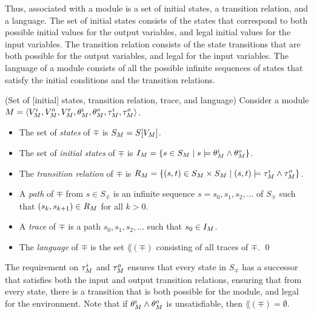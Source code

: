 \noindent Thus, associated with a module is a set of initial
states, a transition relation, and a language. The set of initial
states consists of the states that correspond to both possible
initial values for the output variables, and legal initial values
for the input variables. The transition relation consists of the
state transitions that are both possible for the output variables,
and legal for the input variables. The language of a module
consists of all the possible infinite sequences of states that
satisfy the initial conditions and the transition relations.


\begin{defi}{(Set of [initial] states, transition relation, trace, and language)}
Consider a module $M = \langle {V}^i_M, { V}^o_M,
{ V}^r_M, \theta^i_M, \theta^o_M, \tau^i_M, \tau^o_M \rangle$.
%
\begin{itemize}

\item The set of {\em states\/} of $\mp$ is $S_M =
{ S}[{ V}_M]$.

\item The set of {\em initial states\/} of $\mp$ is $I_M =
\{ s \in S_M \mid s \models \theta^i_M \wedge \theta^o_M \}$.

\item The {\em transition relation\/} of $\mp$ is $R_M =
\{ (s,t) \in S_M \times S_M \mid (s,t) \models \tau^i_M \wedge
\tau^o_M \}$.

\item A {\em path\/} of $\mp$ from $s \in S_\mp$ is an infinite
sequence $s=s_0, s_1, s_2, \ldots$ of $S_\mp$ such that
$(s_k,s_{k+1}) \in R_M$ for all $k > 0$.

\item A {\em trace\/} of $\mp$ is a path $s_0, s_1, s_2, \ldots$
such that $s_0 \in I_M$.

\item The {\em language\/} of $\mp$ is the set $\lang{(\mp)}$
consisting of all traces of $\mp$. \qed
\end{itemize}
\end{defi}

The requirement on $\tau^i_M$ and $\tau^o_M$ ensures that
every state in $S_\mp$ has a successor that satisfies both the
input and output transition relations, ensuring that from every
state, there is a transition that is both possible for the module,
and legal for the environment. Note that if $\theta^i_M \wedge
\theta^o_M$ is unsatisfiable, then $\lang{(\mp)} = \emptyset$.

